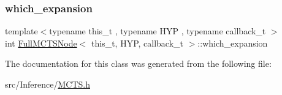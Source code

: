 \subsubsection{\texorpdfstring{which\+\_\+expansion}{which\_expansion}}
{\footnotesize\ttfamily template$<$typename this\+\_\+t , typename H\+YP , typename callback\+\_\+t $>$ \\
int \hyperlink{class_full_m_c_t_s_node}{Full\+M\+C\+T\+S\+Node}$<$ this\+\_\+t, H\+YP, callback\+\_\+t $>$\+::which\+\_\+expansion}



The documentation for this class was generated from the following file\+:\begin{DoxyCompactItemize}
\item 
src/\+Inference/\hyperlink{_m_c_t_s_8h}{M\+C\+T\+S.\+h}\end{DoxyCompactItemize}
